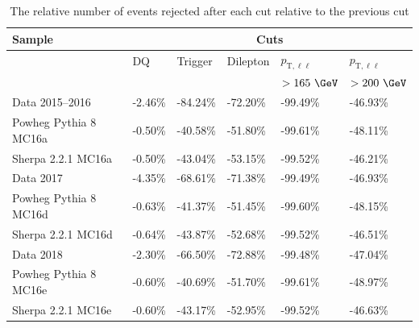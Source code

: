 \begin{table}[h!]
  \centering
  \begin{tabular}{l|l|l|l|l|l}
  \hline\hline
  \textbf{Sample} & \multicolumn{5}{c}{\textbf{Cuts}} \\ \hline
    & DQ & Trigger & Dilepton & $p_{\text{T},\ell\ell}$ & $p_{\text{T},\ell\ell}$ \\
    &  &  &  & $>165~\GeV$ & $>200~\GeV$ \\ \hline\hline
   Data 2015--2016 & -2.46\% & -84.24\% & -72.20\% & -99.49\% & -46.93\% \\ \hline
   Powheg Pythia 8 MC16a & -0.50\% & -40.58\% & -51.80\% & -99.61\% & -48.11\% \\ \hline
   Sherpa 2.2.1 MC16a & -0.50\% & -43.04\% & -53.15\% & -99.52\% & -46.21\% \\ \hline\hline
   Data 2017 & -4.35\% & -68.61\% & -71.38\% & -99.49\% & -46.93\% \\ \hline
   Powheg Pythia 8 MC16d & -0.63\% & -41.37\% & -51.45\% & -99.60\% & -48.15\% \\ \hline
   Sherpa 2.2.1 MC16d & -0.64\% & -43.87\% & -52.68\% & -99.52\% & -46.51\% \\ \hline\hline
   Data 2018 & -2.30\% & -66.50\% & -72.88\% & -99.48\% & -47.04\% \\ \hline
   Powheg Pythia 8 MC16e & -0.60\% & -40.69\% & -51.70\% & -99.61\% & -48.97\% \\ \hline
   Sherpa 2.2.1 MC16e & -0.60\% & -43.17\% & -52.95\% & -99.52\% & -46.63\% \\ \hline\hline
   \end{tabular}
   \caption{The relative number of events rejected after each cut relative to the previous cut}
   \label{tab:RelCF}
\end{table}

